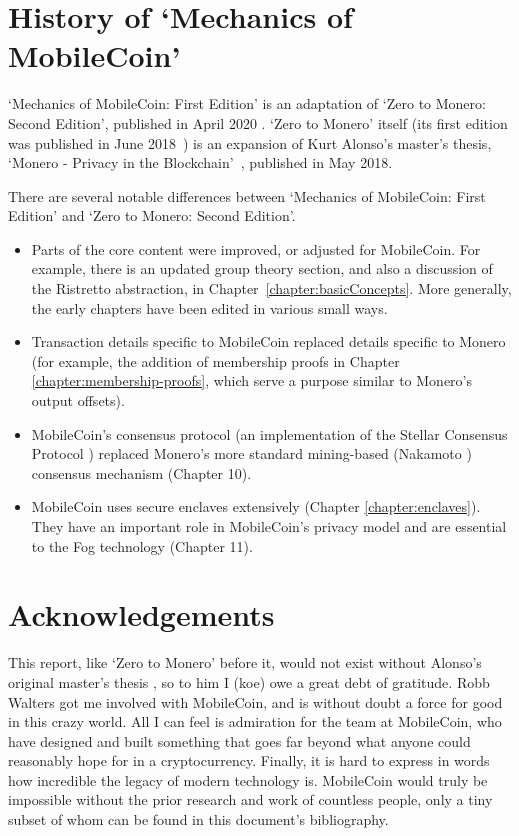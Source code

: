 \section{History of `Mechanics of MobileCoin'}

`Mechanics of MobileCoin: First Edition' is an adaptation of `Zero to Monero: Second Edition', published in April 2020 \cite{ztm-2}. `Zero to Monero' itself (its first edition was published in June 2018~\cite{ztm-1}) is an expansion of Kurt Alonso's master's thesis, `Monero - Privacy in the Blockchain'~\cite{kurt-original}, published in May 2018.

There are several notable differences between `Mechanics of MobileCoin: First Edition' and `Zero to Monero: Second Edition'.

\begin{itemize}
    \item Parts of the core content were improved, or adjusted for MobileCoin. For example, there is an updated group theory section, and also a discussion of the Ristretto abstraction, in Chapter~\ref{chapter:basicConcepts}. More generally, the early chapters have been edited in various small ways.
    \item Transaction details specific to MobileCoin replaced details specific to Monero (for example, the addition of membership proofs in Chapter \ref{chapter:membership-proofs}, which serve a purpose similar to Monero's output offsets).
    \item MobileCoin's consensus protocol (an implementation of the Stellar Consensus Protocol \cite{stellar-consensus-protocol}) replaced Monero's more standard mining-based (Nakamoto \cite{Nakamoto_bitcoin}) consensus mechanism (Chapter 10).
    \item MobileCoin uses secure enclaves extensively (Chapter \ref{chapter:enclaves}). They have an important role in MobileCoin's privacy model and are essential to the Fog technology (Chapter 11).%
\end{itemize}



\section{Acknowledgements}
\label{sec:acknowledgements}


This report, like `Zero to Monero' before it, would not exist without Alonso's original master's thesis \cite{kurt-original}, so to him I (koe) owe a great debt of gratitude. Robb Walters got me involved with MobileCoin, and is without doubt a force for good in this crazy world. All I can feel is admiration for the team at MobileCoin, who have designed and built something that goes far beyond what anyone could reasonably hope for in a cryptocurrency. Finally, it is hard to express in words how incredible the legacy of modern technology is. MobileCoin would truly be impossible without the prior research and work of countless people, only a tiny subset of whom can be found in this document's bibliography.
